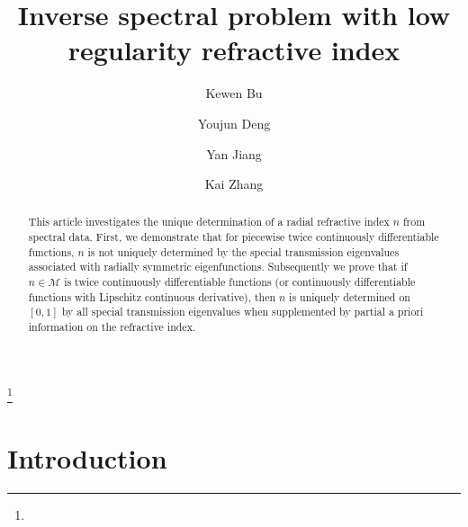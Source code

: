 \documentclass[11pt,reqno]{amsart}
\theoremstyle{definition}
\theoremstyle{remark}
\numberwithin{equation}{section}
\begin{document}
\title[Inverse spectral problem with low regularity refractive index]{Inverse spectral problem with low regularity refractive index}


\author{Kewen Bu}
\address{Department of Mathematics, Jilin University, Changchun, Jilin, China.}
\address{Department of Mathematics, Simon Fraser University, Burnaby, BC, Canada}

\author{Youjun Deng}
\address{School of Mathematics and Statistics, Central South University, Changsha, Hunan, China.}

\author{Yan Jiang}
\address{Department of Mathematics, City University of Hong Kong, Hong Kong SAR, China.}


\author{Kai Zhang}
\address{Department of Mathematics, Jilin University, Changchun, Jilin, China.}


\thanks{}

\date{}


\maketitle



\begin{abstract}

This article investigates the unique determination of a radial refractive index $n$ from spectral data. First, we demonstrate that for piecewise twice continuously differentiable functions, $n$ is not uniquely determined by the special transmission eigenvalues associated with radially symmetric eigenfunctions. Subsequently we prove that if $n \in \mathcal{M}$ is twice continuously differentiable functions (or continuously differentiable functions with Lipschitz continuous derivative), then $n$ is uniquely determined on $[0,1]$ by all special transmission eigenvalues when supplemented by partial a priori information on the refractive index.

\end{abstract}



\section{Introduction}\label{sec:Introduction}
\end{document}
